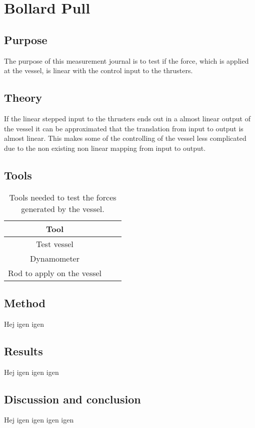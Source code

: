 \chapter{Bollard Pull}
\label{app:bollpull}

\section{Purpose}
The purpose of this measurement journal is to test if the force, which is applied at the vessel, is linear with the control input to the thrusters.

\section{Theory}
If the linear stepped input to the thrusters ends out in a almost linear output of the vessel it can be approximated that the translation from input to output is almost linear. This makes some of the controlling of the vessel less complicated due to the non existing non linear mapping from input to output.

\section{Tools}
\begin{table}[htbp]
\centering
\begin{tabular}{ccc}
	\toprule
  Tool \\
  \midrule
  Test vessel \\
  Dynamometer \\
  Rod to apply on the vessel \\
  	\bottomrule
\end{tabular}
\caption{Tools needed to test the forces generated by the vessel.}
\label{tab:bollpulltool}
\end{table}

\section{Method}
Hej igen igen

\section{Results}
Hej igen igen igen

\section{Discussion and conclusion}
Hej igen igen igen igen
